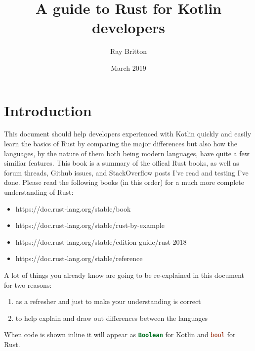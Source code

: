 \documentclass[a4paper,11pt]{article}
\begin{document}
\lstset{basicstyle=\ttfamily\footnotesize,breaklines=true}
\lstset{language=Rust, style=colouredRust}
\setlength{\parindent}{0mm}
\sffamily

\title{A guide to Rust for Kotlin developers}
\author{Ray Britton}
\date{March 2019}

\maketitle

\newpage
{}
\tableofcontents

\newpage
{}
\section{Introduction}

This document should help developers experienced with Kotlin quickly and easily learn the basics of Rust by comparing the major differences but also how the languages, by the nature of them both being modern languages, have quite a few similiar features.
\newline
\newline
This book is a summary of the offical Rust books, as well as forum threads, Github issues, and StackOverflow posts I've read and testing I've done.
Please read the following books (in this order) for a much more complete understanding of Rust:
\begin{itemize}
  \item https://doc.rust-lang.org/stable/book
  \item https://doc.rust-lang.org/stable/rust-by-example
  \item https://doc.rust-lang.org/stable/edition-guide/rust-2018
  \item https://doc.rust-lang.org/stable/reference
\end{itemize}
A lot of things you already know are going to be re-explained in this document for two reasons:
\begin{enumerate}
	\item as a refresher and just to make your understanding is correct
	\item to help explain and draw out differences between the languages
\end{enumerate}
When code is shown inline it will appear as \lstinline[language=Kotlin]{Boolean} for Kotlin and \lstinline[language=Rust]{bool} for Rust.
\end{document}
